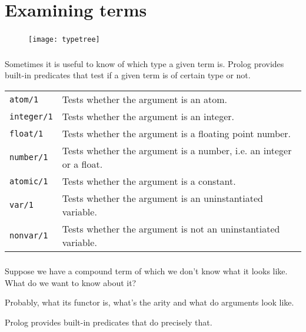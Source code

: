 \section{Examining terms}

\begin{frame}
	\frametitle{\insertsection}
	
	\begin{figure}
		\texttt{[image: typetree]}
	\end{figure}
\end{frame}


\begin{frame}
	\frametitle{\insertsection}
	
	Sometimes it is useful to know of which type a given term is. Prolog provides built-in predicates that test if a given term is of certain type or not.
	
	\begin{table}
		\centering
		\begin{tabular}{ l l }
			\rowcolor{LightGray} \texttt{atom/1} & Tests whether the argument is an atom. \\
			\rowcolor{LightGray} \texttt{integer/1} & Tests whether the argument is an integer. \\
			\rowcolor{LightGray} \texttt{float/1} & Tests whether the argument is a floating point number. \\
			\rowcolor{LightGray} \texttt{number/1} & Tests whether the argument is a number, i.e. an integer or a float. \\
			\rowcolor{LightGray} \texttt{atomic/1} & Tests whether the argument is a constant. \\
			\rowcolor{LightGray} \texttt{var/1} & Tests whether the argument is an uninstantiated variable. \\
			\rowcolor{LightGray} \texttt{nonvar/1} & Tests whether the argument is not an  uninstantiated variable.
		\end{tabular}
	\end{table}
\end{frame}


\begin{frame}
	\frametitle{\insertsection}
	
	Suppose we have a compound term of which we don't know what it looks like. What do we want to know about it?
	
	Probably, what its functor is, what's the arity and what do arguments look like.
	
	Prolog provides built-in predicates that do precisely that.
\end{frame}


